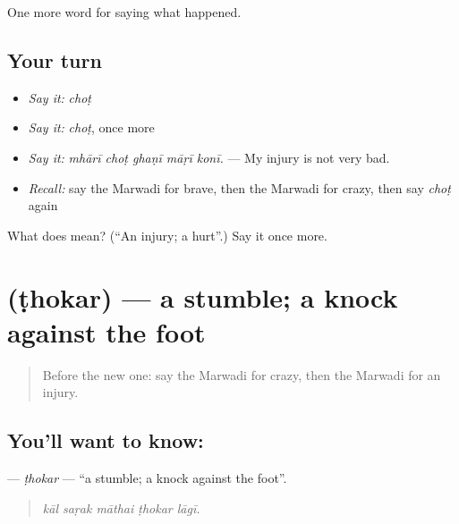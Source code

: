 \begin{grammarlens}[title={What you've built}]
One more word for saying what happened.
\end{grammarlens}

\subsection*{Your turn}
\begin{itemize}
\raggedright
  \item \emph{Say it:} \emph{choṭ}
  \item \emph{Say it:} \emph{choṭ}, once more
  \item \emph{Say it:} \emph{mhārī choṭ ghaṇī māṛī konī.} — My injury is not very bad.
  \item \emph{Recall:} say the Marwadi for brave, then the Marwadi for crazy, then say \emph{choṭ} again
\end{itemize}

\begin{tcolorbox}[breakable,colback=teal!4,colframe=teal!35!black,title={Before you move on}]
What does  mean? (\textquotedblleft{}An injury; a hurt\textquotedblright{}.) Say it once more.
\end{tcolorbox}
\section[\texorpdfstring{\mw{ठोकर} (ṭhokar)}{ठोकर (ṭhokar)}]{ (ṭhokar) — a stumble; a knock against the foot}

\label{lesson:MW-C241-thokar}



\begin{quote}
Before the new one: say the Marwadi for crazy, then the Marwadi for an injury.
\end{quote}

\subsection*{You'll want to know: }
\textbf{} — \emph{ṭhokar} — \textquotedblleft{}a stumble; a knock against the foot\textquotedblright{}.

\begin{quote}
    
\end{quote}

\begin{quote}
\emph{kāl saṛak māthai ṭhokar lāgī.}
\end{quote}

